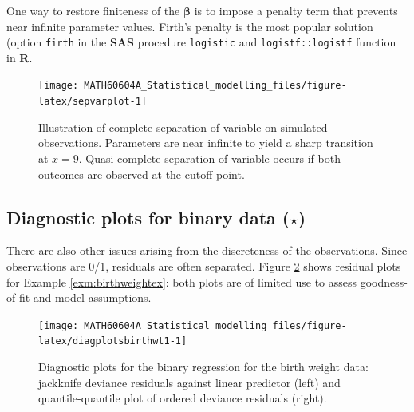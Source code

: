\documentclass[
  11pt,
  letterpaper,
]{book}
\theoremstyle{definition}
\theoremstyle{definition}
\theoremstyle{definition}
\theoremstyle{remark}
\begin{document}
One way to restore finiteness of the \(\boldsymbol{\beta}\) is to impose a penalty term that prevents near infinite parameter values. Firth's penalty is the most popular solution (option \texttt{firth} in the \textbf{SAS} procedure \texttt{logistic} and \texttt{logistf::logistf} function in \textbf{R}.

\begin{figure}

{\centering \texttt{[image: MATH60604A\_Statistical\_modelling\_files/figure-latex/sepvarplot-1]} 

}

\caption{Illustration of complete separation of variable on simulated observations. Parameters are near infinite to yield a sharp transition at $x=9$. Quasi-complete separation of variable occurs if both outcomes are observed at the cutoff point.}\label{fig:sepvarplot}
\end{figure}

\hypertarget{diagnostic-plots-for-binary-data-star}{%
\subsection{\texorpdfstring{Diagnostic plots for binary data (\(\star\))}{Diagnostic plots for binary data (\textbackslash star)}}\label{diagnostic-plots-for-binary-data-star}}

There are also other issues arising from the discreteness of the
observations. Since observations are 0/1, residuals are often separated.
Figure \ref{fig:diagplotsbirthwt1} shows residual plots for Example
\ref{exm:birthweightex}: both plots are of limited use to assess
goodness-of-fit and model assumptions.

\begin{figure}

{\centering \texttt{[image: MATH60604A\_Statistical\_modelling\_files/figure-latex/diagplotsbirthwt1-1]} 

}

\caption{Diagnostic plots for the binary regression for the birth weight data: jackknife deviance residuals against linear predictor (left) and quantile-quantile plot of ordered deviance residuals (right).}\label{fig:diagplotsbirthwt1}
\end{figure}
\end{document}
